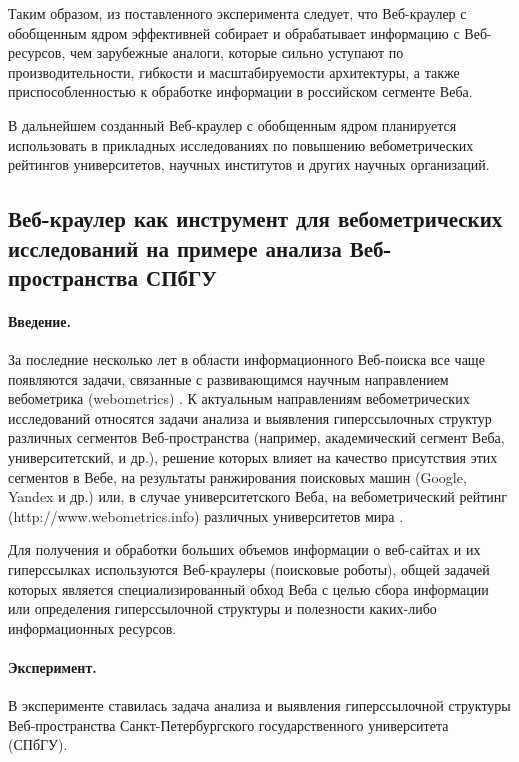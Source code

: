 Таким образом, из поставленного эксперимента следует, что Веб-краулер с обобщенным ядром эффективней собирает и обрабатывает информацию с Веб-ресурсов, чем зарубежные аналоги, которые сильно уступают по производительности, гибкости и масштабируемости архитектуры, а также приспособленностью к обработке информации в российском сегменте Веба.

В дальнейшем созданный Веб-краулер с обобщенным ядром планируется использовать в прикладных исследованиях по повышению вебометрических рейтингов университетов, научных институтов и других научных организаций.

\subsection{Веб-краулер как инструмент для вебометрических исследований на примере анализа Веб-пространства СПбГУ}\label{subsec:ch1/sec3/sub2}

\paragraph{Введение.} За последние несколько лет в области информационного Веб-поиска все чаще появляются задачи, связанные с развивающимся научным направлением вебометрика (webometrics) \cite{HolmbergThelwall,Pechnikov,PechnikovChirkovChuiko,BlekanovSergeevPechnikov}. К актуальным направлениям вебометрических исследований относятся задачи анализа и выявления гиперссылочных структур различных сегментов Веб-пространства (например, академический сегмент Веба, университетский, и др.), решение которых влияет на качество присутствия этих сегментов в Вебе, на результаты ранжирования поисковых машин (Google, Yandex и др.) или, в случае университетского Веба, на вебометрический рейтинг (http://www.webometrics.info) различных университетов мира \cite{BlekanovSergeevPechnikov}.

 Для получения и обработки больших объемов информации о веб-сайтах и их гиперссылках используются Веб-краулеры (поисковые роботы), общей задачей которых является специализированный обход Веба с целью сбора информации или определения гиперссылочной структуры и полезности каких-либо информационных ресурсов.
 
\paragraph{Эксперимент.} В эксперименте ставилась задача анализа и выявления гиперссылочной структуры Веб-пространства Санкт-Петербургского государственного университета (СПбГУ). 
 
